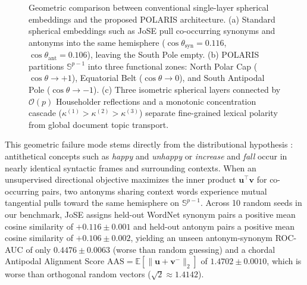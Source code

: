 \documentclass[journal]{IEEEtran}
\begin{document}
\begin{figure}[!t]
{%
}
\caption{Geometric comparison between conventional single-layer spherical embeddings and the proposed POLARIS architecture. (a) Standard spherical embeddings such as JoSE pull co-occurring synonyms and antonyms into the same hemisphere ($\cos\theta_{\text{syn}} = 0.116$, $\cos\theta_{\text{ant}} = 0.106$), leaving the South Pole empty. (b) POLARIS partitions $\mathbb{S}^{p-1}$ into three functional zones: North Polar Cap ($\cos\theta \to +1$), Equatorial Belt ($\cos\theta \to 0$), and South Antipodal Pole ($\cos\theta \to -1$). (c) Three isometric spherical layers connected by $\mathcal{O}(p)$ Householder reflections and a monotonic concentration cascade ($\kappa^{(1)} > \kappa^{(2)} > \kappa^{(3)}$) separate fine-grained lexical polarity from global document topic transport.}
\label{fig:polaris_hook}
\end{figure}

This geometric failure mode stems directly from the distributional hypothesis \cite{harris1954distributional}: antithetical concepts such as \textit{happy} and \textit{unhappy} or \textit{increase} and \textit{fall} occur in nearly identical syntactic frames and surrounding contexts. When an unsupervised directional objective maximizes the inner product $\mathbf{u}^\top \mathbf{v}$ for co-occurring pairs, two antonyms sharing context words experience mutual tangential pulls toward the same hemisphere on $\mathbb{S}^{p-1}$. Across 10 random seeds in our benchmark, JoSE assigns held-out WordNet synonym pairs a positive mean cosine similarity of $+0.116 \pm 0.001$ and held-out antonym pairs a positive mean cosine similarity of $+0.106 \pm 0.002$, yielding an unseen antonym-synonym ROC-AUC of only $0.4476 \pm 0.0063$ (worse than random guessing) and a chordal Antipodal Alignment Score $\text{AAS} = \mathbb{E}[\|\mathbf{u} + \mathbf{v}^-\|_2]$ of $1.4702 \pm 0.0010$, which is worse than orthogonal random vectors ($\sqrt{2} \approx 1.4142$).
\end{document}
